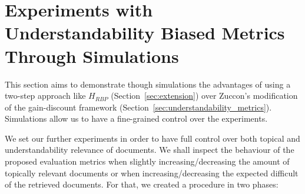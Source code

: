 
\section{Experiments with Understandability Biased Metrics Through Simulations}
\label{sec:simulations}



This section aims to demonstrate though simulations the advantages of using a two-step approach like $H_{RBP}$ (Section~\ref{sec:extension}) over Zuccon's modification of the gain-discount framework (Section~\ref{sec:understandability_metrics}). Simulations allow us to have a fine-grained control over the experiments. 

We set our further experiments in order to have full control over both topical and understandability relevance of documents. We shall inspect the behaviour of the proposed evaluation metrics when slightly increasing/decreasing the amount of topically relevant documents or when increasing/decreasing the expected difficult of the retrieved documents. 
For that, we created a procedure in two phases:

